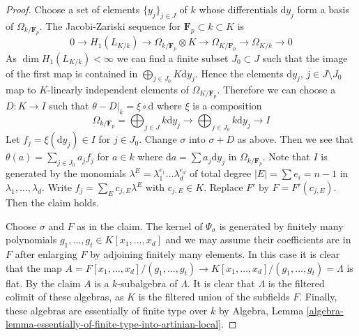 \begin{proof}
\medskip\noindent
Choose a set of elements $\{y_j\}_{j \in J}$ of $k$ whose differentials
$\text{d}y_j$ form a basis of $\Omega_{k/\mathbf{F}_p}$. The Jacobi-Zariski
sequence for $\mathbf{F}_p \subset k \subset K$ is
$$
0 \to H_1(L_{K/k}) \to \Omega_{k/\mathbf{F}_p} \otimes K \to
\Omega_{K/\mathbf{F}_p} \to \Omega_{K/k} \to 0
$$
As $\dim H_1(L_{K/k}) < \infty$ we can find a finite subset $J_0 \subset J$
such that the image of the first map is contained in
$\bigoplus_{j \in J_0} K\text{d}y_j$. Hence the elements
$\text{d}y_j$, $j \in J \setminus J_0$ map to $K$-linearly independent
elements of $\Omega_{K/\mathbf{F}_p}$. Therefore we can choose
a $D : K \to I$ such that $\theta - D|_k = \xi \circ \text{d}$
where $\xi$ is a composition
$$
\Omega_{k/\mathbf{F}_p} = \bigoplus\nolimits_{j \in J} k \text{d}y_j
\longrightarrow \bigoplus\nolimits_{j \in J_0} k \text{d}y_j
\longrightarrow I
$$
Let $f_j = \xi(\text{d}y_j) \in I$ for $j \in J_0$.
Change $\sigma$ into $\sigma + D$ as above. Then we see that
$\theta(a) = \sum_{j \in J_0} a_j f_j$ for $a \in k$ where
$\text{d}a = \sum a_j \text{d}y_j$ in $\Omega_{k/\mathbf{F}_p}$.
Note that $I$ is generated by the monomials
$\lambda^E = \lambda_1^{e_1} \ldots \lambda_d^{e_d}$ of
total degree $|E| = \sum e_i = n - 1$ in $\lambda_1, \ldots, \lambda_d$.
Write $f_j = \sum_E c_{j, E} \lambda^E$ with $c_{j, E} \in K$.
Replace $F'$ by $F = F'(c_{j, E})$. Then the claim holds.

\medskip\noindent
Choose $\sigma$ and $F$ as in the claim. The kernel of $\Psi_\sigma$ is
generated by finitely many polynomials
$g_1, \ldots, g_t \in K[x_1, \ldots, x_d]$ and we may assume their
coefficients are in $F$ after enlarging $F$ by adjoining finitely many
elements. In this case it is clear that the map
$A = F[x_1, \ldots, x_d]/(g_1, \ldots, g_t) \to
K[x_1, \ldots, x_d]/(g_1, \ldots, g_t) = \Lambda$ is flat.
By the claim $A$ is a $k$-subalgebra of $\Lambda$.
It is clear that $\Lambda$ is the filtered colimit of these
algebras, as $K$ is the filtered union of the subfields $F$.
Finally, these algebras are essentially of finite type over $k$ by
Algebra, Lemma
\ref{algebra-lemma-essentially-of-finite-type-into-artinian-local}.
\end{proof}

